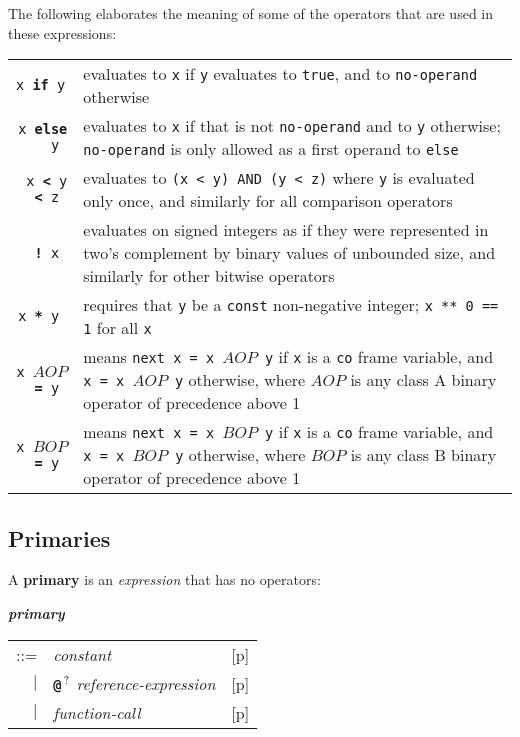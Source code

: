 \documentclass[12pt]{article}
\newcommand{\TT}[1]{{\tt \bfseries #1}}
\newcommand{\QMARK}{{$^{\,\mbox{\footnotesize ?}}$}}
\newcommand{\key}[1]{{\rm \bfseries #1}}
\newcommand{\emkey}[1]{{\em \bfseries #1}}
\newcommand{\pagref}[1]{p\pageref{#1}}
\newenvironment{indpar}[1][0.3in]%
	{\begin{list}{}%
		     {\setlength{\itemsep}{0in}%
		      \setlength{\topsep}{0in}%
		      \setlength{\parsep}{1ex}%
		      \setlength{\labelwidth}{#1}%
		      \setlength{\leftmargin}{#1}%
		      \addtolength{\leftmargin}{\labelsep}}%
	 \item}%
	{\end{list}}
\begin{document}
The following elaborates the meaning of some of the operators
that are used in these expressions:

\begin{tabular}{rp{5.0in}}
\tt x \TT{if} y & evaluates to {\tt x} if {\tt y} evaluates to {\tt true},
                  and to {\tt no-operand} otherwise
\\[0.5ex]
\tt x \TT{else} y & evaluates to {\tt x} if that is not {\tt no-operand}
                  and to {\tt y} otherwise; {\tt no-operand} is only
		  allowed as a first operand to {\tt else}
\\[0.5ex]
\tt x \TT{<} y \TT{<} z & evaluates to {\tt (x < y) AND (y < z)} where
                  {\tt y} is evaluated only once, and similarly for
		  all comparison operators
\\[0.5ex]
\tt \TT{!} x & evaluates on signed integers as if they were represented
               in two's complement by binary values of unbounded size,
	       and similarly for other bitwise operators
\\[0.5ex]
\tt x \TT{**} y & requires that {\tt y} be a {\tt const} non-negative integer;
{\tt x ** 0 == 1} for all {\tt x}
\\[0.5ex]
\tt x $AOP$\TT{=} y & means {\tt next x = x $AOP$ y} if {\tt x}
is a {\tt co} frame variable, and {\tt x = x $AOP$ y} otherwise,
where $AOP$ is any class A binary operator of precedence above 1
\\[0.5ex]
\tt x $BOP$\TT{=} y & means {\tt next x = x $BOP$ y} if {\tt x}
is a {\tt co} frame variable, and {\tt x = x $BOP$ y} otherwise,
where $BOP$ is any class B binary operator of precedence above 1
\end{tabular}

\subsection{Primaries}

A \key{primary} is an {\em expression} that has no operators:
\begin{indpar}
\emkey{primary}
    \begin{tabular}[t]{@{}rll}
    ::= & {\em constant}		& [\pagref{CONSTANTS}] \\
    $|$ & \TT{@}\QMARK{} {\em reference-expression}
                                        & [\pagref{REFERENCE-EXPRESSIONS}] \\
    $|$ & {\em function-call}		& [\pagref{FUNCTION-CALLS}] \\
    \end{tabular}
\end{indpar}
\end{document}
